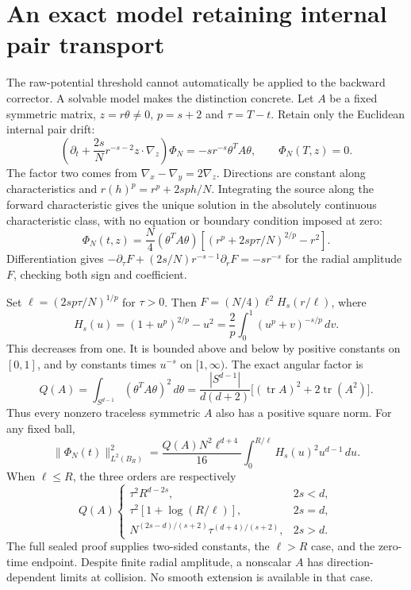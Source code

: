 \documentclass[11pt]{article}
\begin{document}
\section{An exact model retaining internal pair transport}
The raw-potential threshold cannot automatically be applied to the
backward corrector. A solvable model makes the distinction concrete.
Let $A$ be a fixed symmetric matrix, $z=r\theta\ne0$,
$p=s+2$ and $\tau=T-t$. Retain only the Euclidean internal pair drift:
\[
 \left(\partial_t+\frac{2s}{N}r^{-s-2}z\cdot\nabla_z\right)\Phi_N
       =-s r^{-s}\theta^TA\theta,\qquad \Phi_N(T,z)=0.
\]
The factor two comes from $\nabla_x-\nabla_y=2\nabla_z$.
Directions are constant along characteristics and
$r(h)^p=r^p+2sp h/N$. Integrating the source along the forward
characteristic gives the unique solution in the absolutely continuous
characteristic class, with no equation or boundary condition imposed at
zero:
\begin{equation}\label{toy}
 \Phi_N(t,z)=\frac N4(\theta^TA\theta)
       \left[(r^p+2sp\tau/N)^{2/p}-r^2\right].
\end{equation}
Differentiation gives $-\partial_\tau F+(2s/N)r^{-s-1}\partial_rF
=-sr^{-s}$ for the radial amplitude $F$, checking both sign and coefficient.

Set $\ell=(2sp\tau/N)^{1/p}$ for $\tau>0$. Then
$F=(N/4)\ell^2 H_s(r/\ell)$, where
\[
 H_s(u)=(1+u^p)^{2/p}-u^2
 =\frac2p\int_0^1(u^p+v)^{-s/p}\,dv.
\]
This decreases from one. It is bounded above and below by positive
constants on $[0,1]$, and by constants times $u^{-s}$ on $[1,\infty)$.
The exact angular factor is
\[
 Q(A)=\int_{S^{d-1}}(\theta^TA\theta)^2\,d\theta
 =\frac{|S^{d-1}|}{d(d+2)}
       \big[(\operatorname{tr}A)^2+2\operatorname{tr}(A^2)\big].
\]
Thus every nonzero traceless symmetric $A$ also has a positive square norm.
For any fixed ball,
\[
 \|\Phi_N(t)\|_{L^2(B_R)}^2
  =\frac{Q(A)N^2\ell^{d+4}}{16}
       \int_0^{R/\ell}H_s(u)^2u^{d-1}\,du.
\]
When $\ell\le R$, the three orders are respectively
\[
 Q(A)\begin{cases}
  \tau^2R^{d-2s},&2s<d,\\
  \tau^2[1+\log(R/\ell)],&2s=d,\\
  N^{(2s-d)/(s+2)}\tau^{(d+4)/(s+2)},&2s>d.
 \end{cases}
\]
The full sealed proof supplies two-sided constants, the $\ell>R$ case,
and the zero-time endpoint. Despite finite radial amplitude, a nonscalar
$A$ has direction-dependent limits at collision. No smooth extension is
available in that case.
\end{document}
